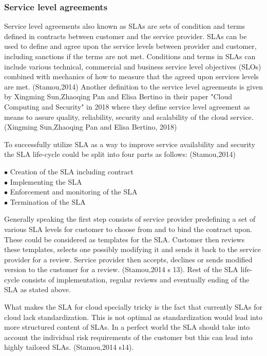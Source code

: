 \documentclass{article}
\begin{document}
\subsubsection{Service level agreements}
Service level agreements also known as SLAs are sets of condition and terms defined in contracts between customer and the service provider. SLAs can be used to define and agree upon the service levels between provider and customer, including sanctions if the terms are not met. Conditions and terms in SLAs can include various technical, commercial and business service level objectives (SLOs) combined with mechanics of how to measure that the agreed upon services levels are met. (Stamou,2014) Another definition to the service level agreements is given by Xingming Sun,Zhaoqing Pan and Elisa Bertino in their paper "Cloud Computing and Security" in 2018 where they define service level agreement as means to assure quality, reliability, security and scalability of the cloud service. (Xingming Sun,Zhaoqing Pan and Elisa Bertino, 2018) 
\par
To successfully utilize SLA as a way to improve service availability and security the SLA life-cycle could be split into four parts as follows: (Stamou,2014)
\begin{description}
        \item[$\bullet$ Creation of the SLA including contract]
        \item[$\bullet$ Implementing the SLA]
        \item[$\bullet$ Enforcement and monitoring of the SLA]
        \item[$\bullet$ Termination of the SLA]
\end{description}
Generally speaking the first step consists of service provider predefining a set of various SLA levels for customer to choose from and to bind the contract upon. These could be considered as templates for the SLA. Customer then reviews these templates, selects one possibly modifying it and sends it back to the service provider for a review. Service provider then accepts, declines or sends modified version to the customer for a review. (Stamou,2014 s 13). Rest of the SLA life-cycle consists of implementation, regular reviews and eventually ending of the SLA as stated above.
\par
What makes the SLA for cloud specially tricky is the fact that currently SLAs for cloud lack standardization. This is not optimal as standardization would lead into more structured content of SLAs. In a perfect world the SLA should take into account the individual risk requirements of the customer but this can lead into highly tailored SLAs. (Stamou,2014 s14).
\end{document}
